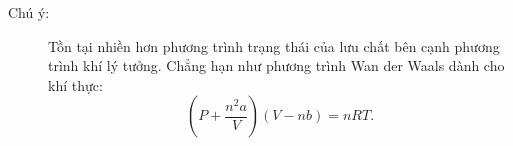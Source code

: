 \documentclass[../../../main.tex]{subfiles}
\begin{document}
    \begin{description}
        \item[Chú ý:] Tồn tại nhiền hơn phương trình trạng thái của lưu chất bên cạnh phương trình khí lý tưởng. Chẳng hạn như phương trình Wan der Waals dành cho khí thực:
            \[
                \left(P+\dfrac{n^2a}{V}\right)\left(V-nb\right)=nRT.
            \]

\end{description}
\end{document}
